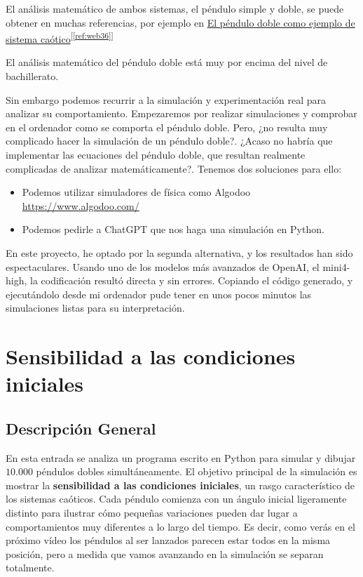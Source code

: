 \documentclass[
  10pt,
  a4paper,
  DIV=11,
  numbers=noendperiod,
  open=any]{scrreprt}
\providecommand{\tightlist}{%
  \setlength{\itemsep}{0pt}\setlength{\parskip}{0pt}}
\numberwithin{equation}{chapter}
\numberwithin{equation}{section}
\renewcommand{\[}{\begin{equation}}
\renewcommand{\]}{\end{equation}}
\newcommand{\refweb}[3]{%
  \href{#1}{#2}\textsuperscript{[\ref{ref:#3}]}%
}
\begin{document}
El análisis matemático de ambos sistemas, el péndulo simple y doble, se
puede obtener en muchas referencias, por ejemplo en
 \refweb{https://paginaspersonales.unam.mx/app/webroot/files/4554/Publica_20190605182303.pdf}{El péndulo doble como ejemplo de sistema caótico}{web36}

El análisis matemático del péndulo doble está muy por encima del nivel
de bachillerato.

Sin embargo podemos recurrir a la simulación y experimentación real para
analizar su comportamiento. Empezaremos por realizar simulaciones y
comprobar en el ordenador como se comporta el péndulo doble. Pero, ¿no
resulta muy complicado hacer la simulación de un péndulo doble?. ¿Acaso
no habría que implementar las ecuaciones del péndulo doble, que resultan
realmente complicadas de analizar matemáticamente?. Tenemos dos
soluciones para ello:

\begin{itemize}
\tightlist
\item
  Podemos utilizar simuladores de física como Algodoo
  \url{https://www.algodoo.com/}
\item
  Podemos pedirle a ChatGPT que nos haga una simulación en Python.
\end{itemize}

En este proyecto, he optado por la segunda alternativa, y los resultados
han sido espectaculares. Usando uno de los modelos más avanzados de
OpenAI, el mini4-high, la codificación resultó directa y sin errores.
Copiando el código generado, y ejecutándolo desde mi ordenador pude
tener en unos pocos minutos las simulaciones listas para su interpretación.  

\chapter{Sensibilidad a las condiciones
iniciales}\label{sensibilidad-a-las-condiciones-iniciales}


\section{Descripción General}\label{descripciuxf3n-general}

En esta entrada se analiza un programa escrito en Python para simular y
dibujar \(10.000\) péndulos dobles simultáneamente. El objetivo
principal de la simulación es mostrar la \textbf{sensibilidad a las
condiciones iniciales}, un rasgo característico de los sistemas
caóticos. Cada péndulo comienza con un ángulo inicial ligeramente
distinto para ilustrar cómo pequeñas variaciones pueden dar lugar a
comportamientos muy diferentes a lo largo del tiempo. Es decir, como
verás en el próximo vídeo los péndulos al ser lanzados parecen estar
todos en la misma posición, pero a medida que vamos avanzando en la
simulación se separan totalmente.
\end{document}
